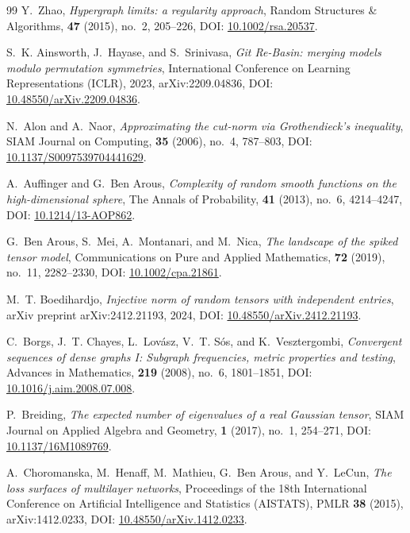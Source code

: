 \documentclass[11pt,a4paper,reqno]{amsart}
\theoremstyle{definition}
\numberwithin{equation}{section}
\begin{document}
\begin{thebibliography}{99}
Y.~Zhao,
\emph{Hypergraph limits: a regularity approach},
Random Structures \& Algorithms, \textbf{47} (2015), no.~2, 205--226, DOI: \href{https://doi.org/10.1002/rsa.20537}{10.1002/rsa.20537}.

S.~K. Ainsworth, J.~Hayase, and S.~Srinivasa,
\emph{Git Re-Basin: merging models modulo permutation symmetries},
International Conference on Learning Representations (ICLR), 2023, arXiv:2209.04836, DOI: \href{https://doi.org/10.48550/arXiv.2209.04836}{10.48550/arXiv.2209.04836}.

N.~Alon and A.~Naor,
\emph{Approximating the cut-norm via Grothendieck's inequality},
SIAM Journal on Computing, \textbf{35} (2006), no.~4, 787--803, DOI: \href{https://doi.org/10.1137/S0097539704441629}{10.1137/S0097539704441629}.

A.~Auffinger and G.~Ben Arous,
\emph{Complexity of random smooth functions on the high-dimensional sphere},
The Annals of Probability, \textbf{41} (2013), no.~6, 4214--4247, DOI: \href{https://doi.org/10.1214/13-AOP862}{10.1214/13-AOP862}.

G.~Ben Arous, S.~Mei, A.~Montanari, and M.~Nica,
\emph{The landscape of the spiked tensor model},
Communications on Pure and Applied Mathematics, \textbf{72} (2019), no.~11, 2282--2330, DOI: \href{https://doi.org/10.1002/cpa.21861}{10.1002/cpa.21861}.

M.~T. Boedihardjo,
\emph{Injective norm of random tensors with independent entries},
arXiv preprint arXiv:2412.21193, 2024, DOI: \href{https://doi.org/10.48550/arXiv.2412.21193}{10.48550/arXiv.2412.21193}.

C.~Borgs, J.~T. Chayes, L.~Lov{\'a}sz, V.~T. S{\'o}s, and K.~Vesztergombi,
\emph{Convergent sequences of dense graphs I: Subgraph frequencies, metric properties and testing},
Advances in Mathematics, \textbf{219} (2008), no.~6, 1801--1851, DOI: \href{https://doi.org/10.1016/j.aim.2008.07.008}{10.1016/j.aim.2008.07.008}.

P.~Breiding,
\emph{The expected number of eigenvalues of a real Gaussian tensor},
SIAM Journal on Applied Algebra and Geometry, \textbf{1} (2017), no.~1, 254--271, DOI: \href{https://doi.org/10.1137/16M1089769}{10.1137/16M1089769}.

A.~Choromanska, M.~Henaff, M.~Mathieu, G.~Ben Arous, and Y.~LeCun,
\emph{The loss surfaces of multilayer networks},
Proceedings of the 18th International Conference on Artificial Intelligence and Statistics (AISTATS), PMLR \textbf{38} (2015), arXiv:1412.0233, DOI: \href{https://doi.org/10.48550/arXiv.1412.0233}{10.48550/arXiv.1412.0233}.


\end{thebibliography}
\end{document}
